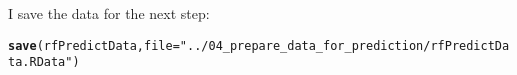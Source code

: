 \documentclass{article}\usepackage[]{graphicx}\usepackage[]{color}
\makeatletter
\newcommand{\hlstr}[1]{\textcolor[rgb]{0.192,0.494,0.8}{#1}}%
\newcommand{\hlstd}[1]{\textcolor[rgb]{0.345,0.345,0.345}{#1}}%
\newcommand{\hlkwc}[1]{\textcolor[rgb]{0.333,0.667,0.333}{#1}}%
\newcommand{\hlkwd}[1]{\textcolor[rgb]{0.737,0.353,0.396}{\textbf{#1}}}%
\newenvironment{kframe}{%
 \def\at@end@of@kframe{}%
 \ifinner\ifhmode%
  \def\at@end@of@kframe{\end{minipage}}%
  \begin{minipage}{\columnwidth}%
 \fi\fi%
 \def\FrameCommand##1{\hskip\@totalleftmargin \hskip-\fboxsep
 \colorbox{shadecolor}{##1}\hskip-\fboxsep
     \hskip-\linewidth \hskip-\@totalleftmargin \hskip\columnwidth}%
 \MakeFramed {\advance\hsize-\width
   \@totalleftmargin\z@ \linewidth\hsize
   \@setminipage}}%
 {\par\unskip\endMakeFramed%
 \at@end@of@kframe}
\newenvironment{knitrout}{}{} %
\makeatother
\begin{document}
I save the data for the next step:
\begin{knitrout}
\color{fgcolor}\begin{kframe}
\begin{alltt}
\hlkwd{save}\hlstd{(rfPredictData,} \hlkwc{file}\hlstd{=}\hlstr{"../04_prepare_data_for_prediction/rfPredictData.RData"}\hlstd{)}
\end{alltt}
\end{kframe}
\end{knitrout}
\end{document}
